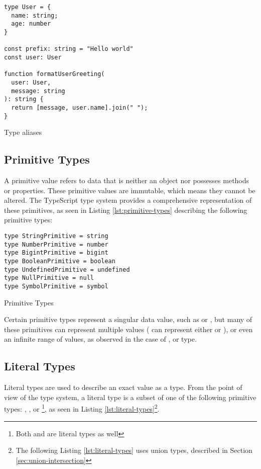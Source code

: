 \begin{listing}[ht]
  \begin{verbatim}
type User = {
  name: string;
  age: number
}

const prefix: string = "Hello world"
const user: User

function formatUserGreeting(
  user: User, 
  message: string
): string {
  return [message, user.name].join(" ");
}
\end{verbatim}
  \caption{Type aliases}\label{lst:type-aliases}
\end{listing}

\clearpage

\subsection{Primitive Types}

A primitive value refers to data that is neither an object nor possesses methods or properties. These primitive values are immutable, which means they cannot be altered. The TypeScript type system provides a comprehensive representation of these primitives, as seen in Listing \ref{lst:primitive-types} describing the following primitive types:

\begin{listing}[ht]
  \begin{verbatim}
type StringPrimitive = string
type NumberPrimitive = number
type BigintPrimitive = bigint
type BooleanPrimitive = boolean
type UndefinedPrimitive = undefined
type NullPrimitive = null
type SymbolPrimitive = symbol
\end{verbatim}
  \caption{Primitive Types}\label{lst:primitive-types}
\end{listing}

Certain primitive types represent a singular data value, such as  or , but many of these primitives can represent multiple values ( can represent either  or ), or even an infinite range of values, as observed in the case of ,  or  type.

\subsection{Literal Types}

Literal types are used to describe an exact value as a type. From the point of view of the type system, a literal type is a subset of one of the following primitive types: , ,  or \footnote{Both  and  are literal types as well}, as seen in Listing \ref{lst:literal-types}\footnote{The following Listing \ref{lst:literal-types} uses union types, described in Section \ref{sec:union-intersection}}.

